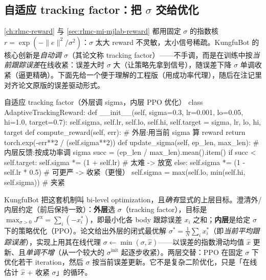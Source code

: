 \subsection{自适应 tracking factor：把 \texorpdfstring{$\sigma$}{sigma} 交给优化}
\label{sec:rlmc-mi-kungfu-blo}

\cref{ch:rlmc-reward} 与 \cref{sec:rlmc-mi-mjlab-reward} 都用固定 $\sigma$ 的指数核 $r=\exp(-\lVert e\rVert^2/\sigma^2)$：$\sigma$ 太大 reward 不灵敏，太小信号稀疏。KungfuBot 的核心创新是\emph{自动调 $\sigma$}（其论文称 tracking factor）——不手调，而是在训练中按\emph{当前跟踪误差}在线收紧：误差大时 $\sigma$ 大（让策略先拿到信号），随误差下降 $\sigma$ 单调收紧（逼更精确）。下面先给一个便于理解的工程版（用成功率代理），随后在注记里对齐论文原版的误差驱动形式。

\begin{codebox}[Python]{自适应 tracking factor（外层调 sigma，内层 PPO 优化）}
class AdaptiveTrackingReward:
    def __init__(self, sigma=0.3, lr=0.001, lo=0.05, hi=1.0, target=0.7):
        self.sigma, self.lr, self.lo, self.hi, self.target = sigma, lr, lo, hi, target
    def compute_reward(self, err):                      # 外层:用当前 sigma 算 reward
        return torch.exp(-err**2 / (self.sigma**2))
    def update_sigma(self, ep_len, max_len):            # 内层反馈:按成功率调 sigma
        succ = (ep_len / max_len).mean().item()
        if succ < self.target:  self.sigma *= (1 + self.lr)        # 太难 -> 放宽
        else:                   self.sigma *= (1 - self.lr * 0.5)  # 可更严 -> 收紧（更慢）
        self.sigma = max(self.lo, min(self.hi, self.sigma))        # 夹紧
\end{codebox}

\begin{note}
KungfuBot 把这套机制叫 bi-level optimization，且\emph{确有}显式的上层目标。澄清外/内层约定（前后保持一致）：\textbf{外层}选 $\sigma$（tracking factor），目标是 $\max_{\sigma>0} J^{\mathrm{ex}}=\sum_i(-x_i^\ast)$，即最小化各 body 跟踪误差 $x_i$ 之和；\textbf{内层}是给定 $\sigma$ 下的策略优化（PPO）。论文给出外层的闭式最优解 $\sigma^\ast=\tfrac1N\sum_i x_i^\ast$（即\emph{当前平均跟踪误差}），实现上用其在线代理 $\sigma\leftarrow\min(\sigma,\hat{x})$——以误差的指数滑动均值 $\hat{x}$ 更新、且\emph{单调不增}（从一个较大的 $\sigma^{\text{init}}$ 起逐步收紧）。两层交替：PPO 在固定 $\sigma$ 下优化若干 iteration，然后 $\sigma$ 按当前误差更新。它不是复杂二阶优化，只是「在线估计 $\hat x$ + 收紧 $\sigma$」的循环。
\end{note}

